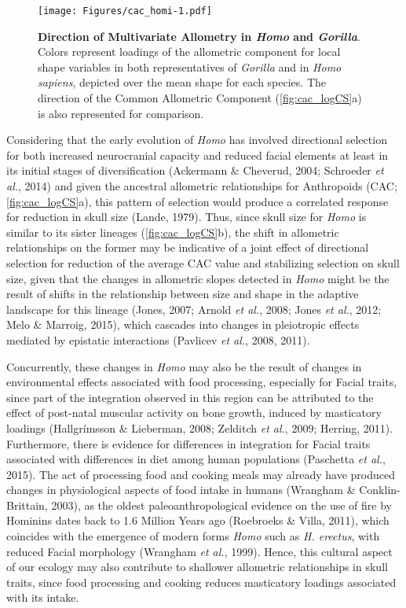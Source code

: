 \documentclass[12pt,twoside]{report}
\begin{document}
\begin{figure}[htbp]
\centering
\texttt{[image: Figures/cac\_homi-1.pdf]}
\caption{\textbf{Direction of Multivariate Allometry in \emph{Homo} and
\emph{Gorilla}}. Colors represent loadings of the allometric component
for local shape variables in both representatives of \emph{Gorilla} and
in \emph{Homo sapiens}, depicted over the mean shape for each species.
The direction of the Common Allometric Component
(\autoref{fig:cac_logCS}a) is also represented for comparison.
\label{fig:cac_homi}}
\end{figure}

Considering that the early evolution of \emph{Homo} has involved
directional selection for both increased neurocranial capacity and
reduced facial elements at least in its initial stages of
diversification (Ackermann \& Cheverud, 2004; Schroeder \emph{et al.},
2014) and given the ancestral allometric relationships for Anthropoids
(CAC; \autoref{fig:cac_logCS}a), this pattern of selection would produce
a correlated response for reduction in skull size (Lande, 1979). Thus,
since skull size for \emph{Homo} is similar to its sister lineages
(\autoref{fig:cac_logCS}b), the shift in allometric relationships on the
former may be indicative of a joint effect of directional selection for
reduction of the average CAC value and stabilizing selection on skull
size, given that the changes in allometric slopes detected in
\emph{Homo} might be the result of shifts in the relationship between
size and shape in the adaptive landscape for this lineage (Jones, 2007;
Arnold \emph{et al.}, 2008; Jones \emph{et al.}, 2012; Melo \& Marroig,
2015), which cascades into changes in pleiotropic effects mediated by
epistatic interactions (Pavlicev \emph{et al.}, 2008, 2011).

Concurrently, these changes in \emph{Homo} may also be the result of
changes in environmental effects associated with food processing,
especially for Facial traits, since part of the integration observed in
this region can be attributed to the effect of post-natal muscular
activity on bone growth, induced by masticatory loadings (Hallgrímsson
\& Lieberman, 2008; Zelditch \emph{et al.}, 2009; Herring, 2011).
Furthermore, there is evidence for differences in integration for Facial
traits associated with differences in diet among human populations
(Paschetta \emph{et al.}, 2015). The act of processing food and cooking
meals may already have produced changes in physiological aspects of food
intake in humans (Wrangham \& Conklin-Brittain, 2003), as the oldest
paleoanthropological evidence on the use of fire by Hominins dates back
to 1.6 Million Years ago (Roebroeks \& Villa, 2011), which coincides
with the emergence of modern forms \emph{Homo} such as \emph{H.
erectus}, with reduced Facial morphology (Wrangham \emph{et al.}, 1999).
Hence, this cultural aspect of our ecology may also contribute to
shallower allometric relationships in skull traits, since food
processing and cooking reduces masticatory loadings associated with its
intake.
\end{document}
